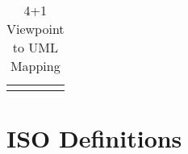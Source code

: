 \begin{sidewaystable}[h]
\begin{tabularx}{\textwidth}{X X X X}
                                                                 &                                                                   &                                                                                                                                                                                &                                                                                                               
\end{tabularx}
\caption{4+1 Viewpoint to UML Mapping}
\label{table:viewpoints}
\end{sidewaystable}



\section{ISO Definitions}
